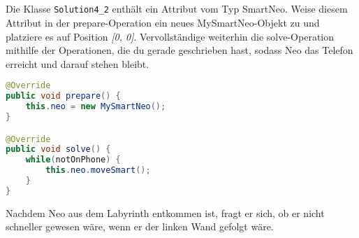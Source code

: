 \begin{questions}
\begin{parts}
        \part{} Die Klasse \lstinline{Solution4_2} enthält ein Attribut vom Typ SmartNeo.
        Weise diesem Attribut in der prepare-Operation ein neues MySmartNeo-Objekt zu und
        platziere es auf Position \emph{[0, 0]}.
        Vervollständige weiterhin die solve-Operation mithilfe der Operationen,
        die du gerade geschrieben hast, sodass Neo das Telefon erreicht und darauf stehen bleibt.


        \begin{solution}
        \begin{lstlisting}[language=Java]
@Override
public void prepare() {
    this.neo = new MySmartNeo();
}

@Override
public void solve() {
    while(notOnPhone) {
        this.neo.moveSmart();
    }
}
        \end{lstlisting}
        \end{solution}
    \end{parts}


    Nachdem Neo aus dem Labyrinth entkommen ist, fragt er sich, ob er nicht schneller gewesen wäre, wenn er der linken Wand gefolgt wäre.

\end{questions}
